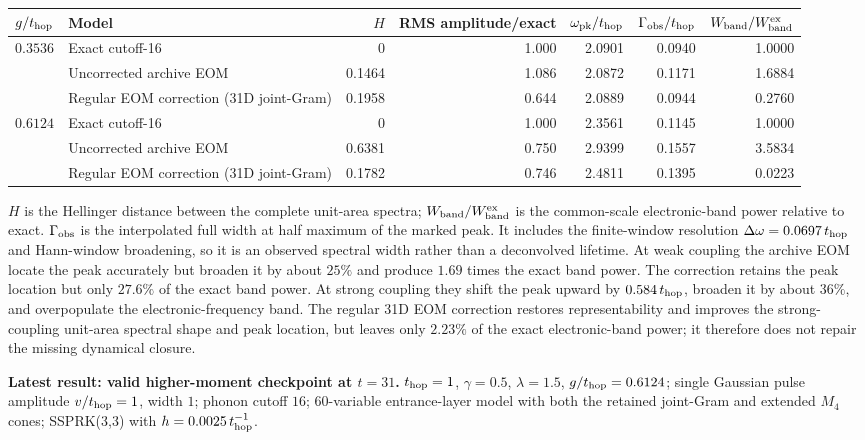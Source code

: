 \documentclass[10pt]{article}
\begin{document}
\begin{center}
  \scriptsize
  \setlength{\tabcolsep}{3.6pt}
  \begin{tabular}{@{}llrrrrr@{}}
    \toprule
    $g/t_{\rm hop}$ & Model & $H$ & RMS amplitude/exact
      & $\omega_{\rm pk}/t_{\rm hop}$
      & $\Gamma_{\rm obs}/t_{\rm hop}$
      & $W_{\rm band}/W_{\rm band}^{\rm ex}$ \\
    \midrule
    $0.3536$ & Exact cutoff-16 & 0 & 1.000 & 2.0901 & 0.0940 & 1.0000 \\
             & Uncorrected archive EOM & 0.1464 & 1.086 & 2.0872 & 0.1171 & 1.6884 \\
             & Regular EOM correction (31D joint-Gram) & 0.1958 & 0.644 & 2.0889 & 0.0944 & 0.2760 \\
    \addlinespace
    $0.6124$ & Exact cutoff-16 & 0 & 1.000 & 2.3561 & 0.1145 & 1.0000 \\
             & Uncorrected archive EOM & 0.6381 & 0.750 & 2.9399 & 0.1557 & 3.5834 \\
             & Regular EOM correction (31D joint-Gram) & 0.1782 & 0.746 & 2.4811 & 0.1395 & 0.0223 \\
    \bottomrule
  \end{tabular}
\end{center}
\vspace{-3pt}
{\footnotesize\noindent
$H$ is the Hellinger distance between the complete unit-area spectra;
$W_{\rm band}/W_{\rm band}^{\rm ex}$ is the common-scale electronic-band
power relative to exact.
$\Gamma_{\rm obs}$ is the interpolated full width at half maximum of the
marked peak. It includes the finite-window resolution
$\Delta\omega=0.0697\,t_{\rm hop}$ and Hann-window broadening, so it is an
observed spectral width rather than a deconvolved lifetime. At weak coupling
the archive EOM locate the peak accurately but broaden it by about $25\%$
and produce $1.69$ times the exact band power. The correction retains the
peak location but only $27.6\%$ of the exact band power.
At strong coupling they shift the peak upward by $0.584\,t_{\rm hop}$,
broaden it by about $36\%$, and overpopulate the electronic-frequency band.
The regular 31D EOM correction restores representability and improves the
strong-coupling unit-area spectral shape and peak location, but leaves only
$2.23\%$ of the exact electronic-band power; it therefore does not repair the
missing dynamical closure.\par}

\clearpage

\begin{center}
\small
\textbf{Latest result: valid higher-moment checkpoint at $t=31$.}
$t_{\rm hop}=1$, $\gamma=0.5$, $\lambda=1.5$, $g/t_{\rm hop}=0.6124$;
single Gaussian pulse amplitude $v/t_{\rm hop}=1$, width $1$;
phonon cutoff $16$; 60-variable entrance-layer model with both the retained
joint-Gram and extended $M_4$ cones; SSPRK(3,3) with
$h=0.0025\,t_{\rm hop}^{-1}$.
\end{center}
\end{document}
